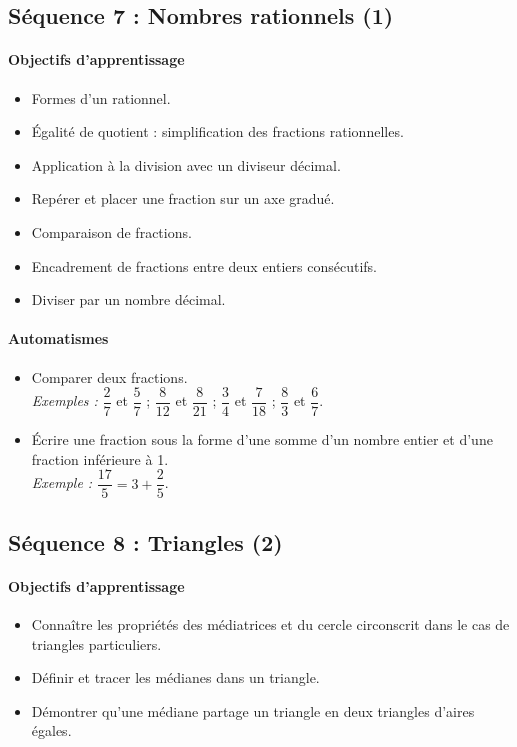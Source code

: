 \documentclass[11pt,a4paper]{article}
\begin{document}
\subsection*{Séquence 7 : Nombres rationnels (1)}

\paragraph{Objectifs d'apprentissage}
\begin{itemize}[label=\bullet]
    \item Formes d'un rationnel.
    \item Égalité de quotient : simplification des fractions rationnelles.
    \item Application à la division avec un diviseur décimal.
    \item Repérer et placer une fraction sur un axe gradué.
    \item Comparaison de fractions.
    \item Encadrement de fractions entre deux entiers consécutifs.
    \item Diviser par un nombre décimal.
\end{itemize}

\paragraph{Automatismes}
\begin{itemize}[label=\bullet]
    \item Comparer deux fractions.\\
    \textit{Exemples :} $\dfrac{2}{7}$ et $\dfrac{5}{7}$ ; $\dfrac{8}{12}$ et $\dfrac{8}{21}$ ; $\dfrac{3}{4}$ et $\dfrac{7}{18}$ ; $\dfrac{8}{3}$ et $\dfrac{6}{7}$.
    \item Écrire une fraction sous la forme d'une somme d'un nombre entier et d'une fraction inférieure à 1.\\
    \textit{Exemple :} $\dfrac{17}{5} = 3 + \dfrac{2}{5}$.
\end{itemize}


\subsection*{Séquence 8 : Triangles (2)}

\paragraph{Objectifs d'apprentissage}
\begin{itemize}[label=\bullet]
    \item Connaître les propriétés des médiatrices et du cercle circonscrit dans le cas de triangles particuliers.
    \item Définir et tracer les médianes dans un triangle.
    \item Démontrer qu'une médiane partage un triangle en deux triangles d'aires égales.
\end{itemize}
\end{document}
